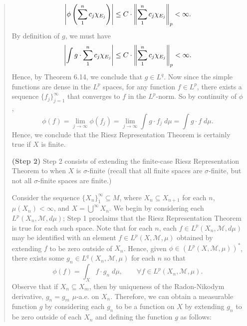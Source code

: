 \documentclass{article}
\begin{document}
\begin{itemize}
\begin{quote}
\begin{solutions}
\begin{enumerate}[itemsep =-2pt,label = (\arabic{*})]
				\begin{equation}
					\left| \phi\left(\sum_{1}^{n}c_{j}\chi_{E_{j}}\right) \right| \leq C \cdot \left\Vert \sum_{1}^{n}c_{j}\chi_{E_{j}} \right\Vert_{p} < \infty. 
				\end{equation}
				By definition of $g$, we must have 
				\begin{equation}
					\left| \int g \cdot \sum_{1}^{n}c_{j}\chi_{E_{j}} \right| \leq C \cdot \left\Vert \sum_{1}^{n}c_{j}\chi_{E_{j}} \right\Vert_{p} < \infty. 
				\end{equation}
				Hence, by Theorem 6.14, we conclude that $g \in L^{q}$. Now since the simple functions are dense in the $L^{p}$ spaces, for any function $f \in L^{p}$, there exists a sequence $\{f_{j}\}_{j = 1}^{\infty}$ that converges to $f$ in the $L^{p}$-norm. So by continuity of $\phi$, 
				\begin{equation}
					\phi(f) = \lim_{j \to \infty}\phi(f_{j}) = \lim_{j \to \infty}\int g \cdot f_{j}\;d\mu = \int g \cdot f\;d\mu. 
				\end{equation}
				Hence, we conclude that the Riesz Representation Theorem is certainly true if $X$ is finite. 
			\end{enumerate}
		\end{solutions}
		\textbf{(Step 2)} Step 2 consists of extending the finite-case Riesz Representation Theorem to when $X$ is $\sigma$-finite (recall that all finite spaces are $\sigma$-finite, but not all $\sigma$-finite spaces are finite.) \newline 
		\begin{solutions} 
			Consider the sequence $\{X_{n}\}_{1}^{\infty}\subseteq M$, where $X_{n} \subseteq X_{n +1}$ for each $n$, $\mu(X_{n}) < \infty$, and $X = \bigcup^{\infty}X_{n}$. We begin by considering each $L^{p}(X_{n}, \mathscr{M}, d\mu)$; Step 1 proclaims that the Riesz Representation Theorem is true for each such space. Note that for each $n$, each $f \in L^{p}(X_{n}, \mathscr{M}, d\mu)$ may be identified with an element $f \in L^{p}(X, \mathscr{M}, \mu)$ obtained by extending $f$ to be zero outside of $X_{n}$. Hence, given $\phi \in (L^{p}(X, \mathscr{M}, \mu))^{\ast}$, there exists some $g_{n} \in L^{q}(X_{n}, \mathscr{M}, \mu)$ for each $n$ so that 
			\begin{equation}
				\phi(f) = \int_{X}f \cdot g_{n}\;d\mu, \qquad \forall f \in L^{p}(X_{n}, \mathscr{M}, \mu). 
			\end{equation}
			Observe that if $X_{n} \subseteq X_{m}$, then by uniqueness of the Radon-Nikodym derivative, $g_{n} = g_{m}$ $\mu$-a.e. on $X_{n}$. Therefore, we can obtain a measurable function $g$ by considering each $g_{n}$ to be a function on $X$ by extending $g_{n}$ to be zero outside of each $X_{n}$ and defining the function $g$ as follows: 

\end{solutions}
\end{quote}
\end{itemize}
\end{document}
